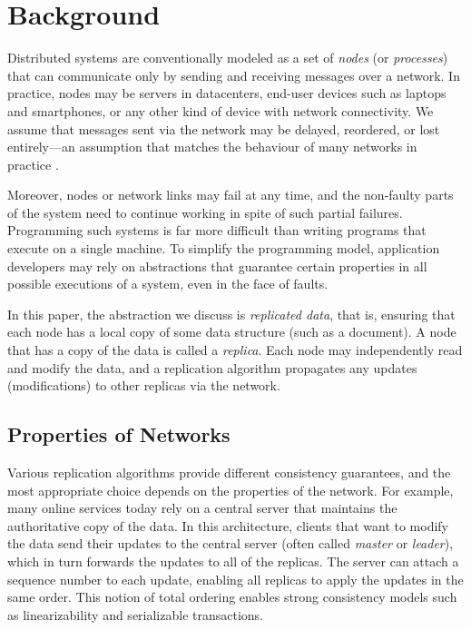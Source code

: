 \section{Background}
\label{sect.background}

Distributed systems are conventionally modeled as a set of \emph{nodes} (or \emph{processes}) that
can communicate only by sending and receiving messages over a network. In practice, nodes may be
servers in datacenters, end-user devices such as laptops and smartphones, or any other kind of
device with network connectivity. We assume that messages sent via the network may be delayed,
reordered, or lost entirely---an assumption that matches the behaviour of many networks in practice
\cite{Bailis:2014jx}.

Moreover, nodes or network links may fail at any time, and the non-faulty parts of the system need
to continue working in spite of such partial failures. Programming such systems is far more
difficult than writing programs that execute on a single machine. To simplify the programming model,
application developers may rely on abstractions that guarantee certain properties in all possible
executions of a system, even in the face of faults.

In this paper, the abstraction we discuss is \emph{replicated data}, that is, ensuring that each
node has a local copy of some data structure (such as a document). A node that has a copy of the
data is called a \emph{replica}. Each node may independently read and modify the data, and a
replication algorithm propagates any updates (modifications) to other replicas via the network.

\subsection{Properties of Networks}\label{sect.background.networks}

Various replication algorithms provide different consistency guarantees, and the most appropriate
choice depends on the properties of the network. For example, many online services today rely on a
central server that maintains the authoritative copy of the data. In this architecture, clients that
want to modify the data send their updates to the central server (often called \emph{master} or
\emph{leader}), which in turn forwards the updates to all of the replicas. The server can attach a
sequence number to each update, enabling all replicas to apply the updates in the same order. This
notion of total ordering enables strong consistency models such as linearizability
\cite{Herlihy:1990jq} and serializable transactions.

